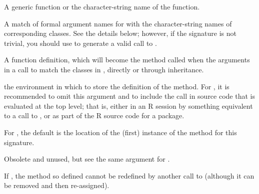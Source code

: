 \begin{Arguments}
\begin{ldescription}
\item[\code{f}]  A generic function or the character-string name of the function. 
\item[\code{signature}]  A match of formal argument names for  with
the character-string names of corresponding classes.  See the
details below; however, if the signature is not trivial, you should use  to generate a valid call to .
\item[\code{definition}]  A function definition, which will become the method
called when the arguments in a call to  match the
classes in , directly or through inheritance. 
\item[\code{where}] the environment in which to store the definition of the
method.
For , it is recommended to omit this argument and to include the call in source code that is evaluated at the top level; that is, either in an R session by something equivalent to a call to , or as part of the R source code for a package.

For , the default is the location of the (first)
instance of the method for this signature.
\item[\code{valueClass}]  Obsolete and unused, but see the same argument for . 
\item[\code{sealed}]  If , the method so defined cannot be
redefined by another call to  (although it can
be removed and then re-assigned).
\end{ldescription}
\end{Arguments}
%
